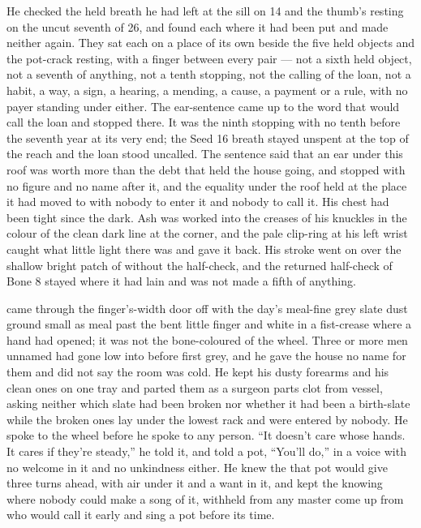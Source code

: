 He checked the held breath he had left at the sill on  14 and the thumb's resting on the uncut seventh of  26, and found each where it had been put and made neither again. They sat each on a place of its own beside the five held objects and the pot-crack resting, with a finger between every pair — not a sixth held object, not a seventh of anything, not a tenth stopping, not the calling of the loan, not a habit, a way, a sign, a hearing, a mending, a cause, a payment or a rule, with no payer standing under either. The ear-sentence came up to the word that would call the loan and stopped there. It was the ninth stopping with no tenth before the seventh year at its very end; the Seed 16 breath stayed unspent at the top of the reach and the loan stood uncalled. The sentence said that an ear under this roof was worth more than the debt that held the house going, and stopped with no figure and no name after it, and the equality under the roof held at the place it had moved to with nobody to enter it and nobody to call it. His chest had been tight since the dark. Ash was worked into the creases of his knuckles in the colour of the clean dark line at the corner, and the pale clip-ring at his left wrist caught what little light there was and gave it back. His stroke went on over the shallow bright patch of  without the half-check, and the returned half-check of Bone 8 stayed where it had lain and was not made a fifth of anything.

 came through the finger's-width door off  with the day's meal-fine grey slate dust ground small as meal past the bent little finger and white in a fist-crease where a hand had opened; it was not the bone-coloured  of the wheel. Three or more men unnamed had gone low into  before first grey, and he gave the house no name for them and did not say the room was cold. He kept his dusty forearms and his clean ones on one tray and parted them as a surgeon parts clot from vessel, asking neither which slate had been broken nor whether it had been a birth-slate while the broken ones lay under the lowest rack and were entered by nobody. He spoke to the wheel before he spoke to any person. “It doesn't care whose hands. It cares if they're steady,” he told it, and told a pot, “You'll do,” in a voice with no welcome in it and no unkindness either. He knew the  that pot would give three turns ahead, with air under it and a want in it, and kept the knowing where nobody could make a song of it, withheld from any master come up from  who would call it early and sing a pot before its time.

